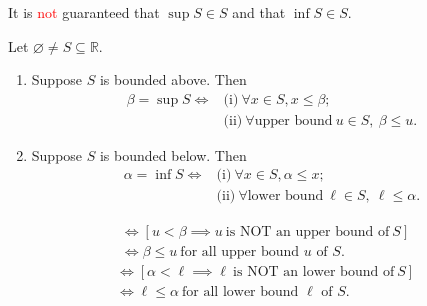 \documentclass[11pt,openany]{article}
\begin{document}
\begin{remark*}[\textcolor{red}{\bf Caution!}]
	It is \textcolor{red}{not} guaranteed that $\sup S\in S$ and that $\inf S\in S$.
\end{remark*}
\begin{remark*}
	Let $\varnothing\neq S\subseteq\mathbb{R}$. \begin{enumerate}[(1)]
		\item Suppose $S$ is bounded above. Then \begin{align*}
			\beta=\sup S \iff&\text{(i)}\ \forall x\in S, x\leq\beta;\\
			&\text{(ii)}\ \forall\text{upper bound}\ u\in S,\ \beta\leq u.
		\end{align*}
		\item Suppose $S$ is bounded below. Then \begin{align*}
			\alpha=\inf S \iff&\text{(i)}\ \forall x\in S, \alpha\leq x;\\
			&\text{(ii)}\ \forall \text{lower bound}\ \ell\in S,\ \ell\leq \alpha.
		\end{align*}
	\end{enumerate} 
\end{remark*}
\begin{remark*}
	\begin{align*}
		[u\ \text{is any upper bound of}\ S\implies \beta\leq u]&\iff [u<\beta\implies u\ \text{is NOT an upper bound of}\ S]\\
		&\iff \beta\leq u\ \text{for all upper bound $u$ of $S$}.
	\end{align*}
	\begin{align*}
		[\ell\ \text{is any lower bound of}\ S\implies \ell\leq\alpha]&\iff [\alpha<\ell\implies\ell\ \text{is NOT an lower bound of}\ S]\\
		&\iff \ell\leq \alpha\ \text{for all lower bound $\ell$ of $S$}.
	\end{align*}
\end{remark*}
\newpage
\end{document}
